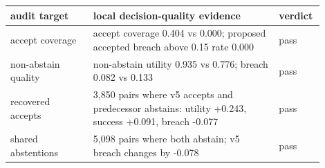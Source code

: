 \begin{tabular}{p{0.25\linewidth}p{0.56\linewidth}p{0.09\linewidth}}
\toprule
audit target & local decision-quality evidence & verdict \\
\midrule
accept coverage & accept coverage 0.404 vs 0.000; proposed accepted breach above 0.15 rate 0.000 & pass \\
non-abstain quality & non-abstain utility 0.935 vs 0.776; breach 0.082 vs 0.133 & pass \\
recovered accepts & 3,850 pairs where v5 accepts and predecessor abstains: utility +0.243, success +0.091, breach -0.077 & pass \\
shared abstentions & 5,098 pairs where both abstain; v5 breach changes by -0.078 & pass \\
\bottomrule
\end{tabular}
